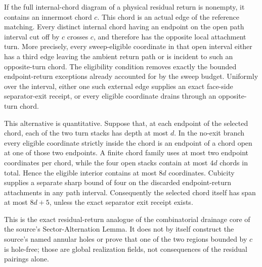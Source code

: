 \begin{lemma}
\label{lem:residual-return-innermost-chord-drainage}
If the full internal-chord diagram of a physical residual return is nonempty,
it contains an innermost chord $c$.  This chord is an actual edge of the
reference matching.  Every distinct internal chord having an endpoint on the
open path interval cut off by $c$ crosses $c$, and therefore has the opposite
local attachment turn.  More precisely, every sweep-eligible coordinate in
that open interval either has a third edge leaving the ambient return path or
is incident to such an opposite-turn chord.  The eligibility condition removes
exactly the bounded endpoint-return exceptions already accounted for by the
sweep budget.  Uniformly over the interval, either one such external edge
supplies an exact face-side separator-exit receipt, or every eligible
coordinate drains through an opposite-turn chord.

This alternative is quantitative.  Suppose that, at each endpoint of the
selected chord, each of the two turn stacks has depth at most $d$.  In the
no-exit branch every eligible coordinate strictly inside the chord is an
endpoint of a chord open at one of those two endpoints.  A finite chord family
uses at most two endpoint coordinates per chord, while the four open stacks
contain at most $4d$ chords in total.  Hence the eligible interior contains at
most $8d$ coordinates.  Cubicity supplies a separate sharp bound of four on
the discarded endpoint-return attachments in any path interval.  Consequently
the selected chord itself has span at most $8d+5$, unless the exact separator
exit receipt exists.

This is the exact residual-return analogue of the combinatorial drainage core
of the source's Sector-Alternation Lemma.  It does not by itself construct the
source's named annular holes or prove that one of the two regions bounded by
$c$ is hole-free; those are global realization fields, not consequences of
the residual pairings alone.
\end{lemma}

